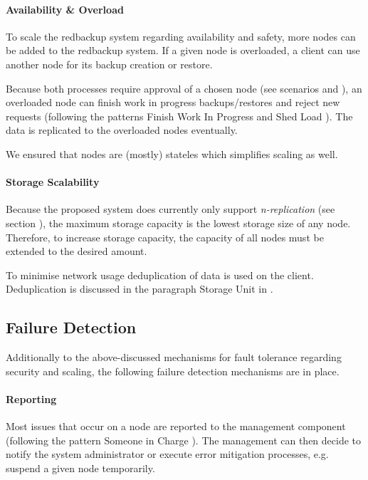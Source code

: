\paragraph{Availability \& Overload} To scale the redbackup system regarding availability and safety, more \glspl{node} can be added to the redbackup system. If a given \gls{node} is overloaded, a \gls{client} can use another \gls{node} for its backup creation or restore.

Because both processes require approval of a chosen \gls{node} (see scenarios  and ), an overloaded \gls{node} can finish work in progress backups/restores and reject new requests (following the patterns Finish Work In Progress and Shed Load \cite{fault-tolerance}). The data is replicated to the overloaded \glspl{node} eventually.

We ensured that \glspl{node} are (mostly) stateles which simplifies scaling as well.

\paragraph{Storage Scalability} Because the proposed system does currently only support \emph{n-replication} (see section ), the maximum storage capacity is the lowest storage size of any \gls{node}. Therefore, to increase storage capacity, the capacity of all \glspl{node} must be extended to the desired amount.

To minimise network usage deduplication of data is used on the \gls{client}. Deduplication is  discussed in the paragraph Storage Unit in  .

\subsection{Failure Detection}

Additionally to the above-discussed mechanisms for fault tolerance regarding security and scaling, the following failure detection mechanisms are in place.

\paragraph{Reporting} Most issues that occur on a \gls{node} are reported to the \gls{management} component (following the pattern Someone in Charge \cite{fault-tolerance}). The \gls{management} can then decide to notify the system administrator or execute error mitigation processes, e.g. suspend a given \gls{node} temporarily.

